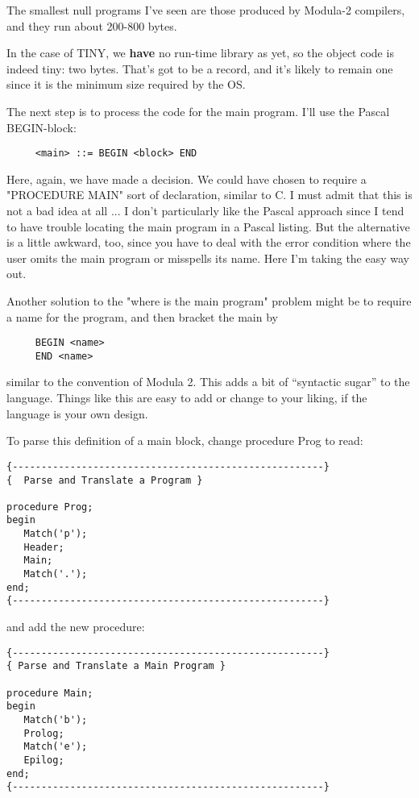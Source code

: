 The  smallest  null  programs  I've  seen are those  produced  by Modula-2 compilers, and they run about 200-800 bytes.

In the case of TINY, we {\bfseries have} no run-time library  as  yet, so the object code is indeed tiny:  two  bytes. That's  got  to  be a record, and it's  likely  to  remain  one since it is the minimum size required by the OS.

The  next step is to process the code for the main program. I'll use the Pascal BEGIN-block:

\begin{verbatim}
     <main> ::= BEGIN <block> END
\end{verbatim}

Here, again, we  have made a decision. We could have chosen to require a "PROCEDURE MAIN" sort of declaration, similar to C. I must  admit  that  this  is  not  a bad idea at all ... I  don't particularly  like  the  Pascal  approach  since I tend  to  have trouble locating the main  program  in a Pascal listing. But the alternative is a little awkward, too, since you have to deal with the  error condition where the user omits  the  main  program  or misspells its name. Here I'm taking the easy way out.

Another solution to the "where is the main program" problem might be to require a name for  the  program, and then bracket the main by

\begin{verbatim}
     BEGIN <name>
     END <name>
\end{verbatim}

similar to the convention of  Modula  2. This  adds  a  bit of ``syntactic sugar'' to the language. Things like this are  easy to add or change to your liking, if the language is your own design.

To parse this definition of a main block, change  procedure Prog to read:

\begin{verbatim}
{------------------------------------------------------}
{  Parse and Translate a Program }

procedure Prog;
begin
   Match('p');
   Header;
   Main;
   Match('.');
end;
{------------------------------------------------------}
\end{verbatim}

and add the new procedure:

\begin{verbatim}
{------------------------------------------------------}
{ Parse and Translate a Main Program }

procedure Main;
begin
   Match('b');
   Prolog;
   Match('e');
   Epilog;
end;
{------------------------------------------------------}
\end{verbatim}

